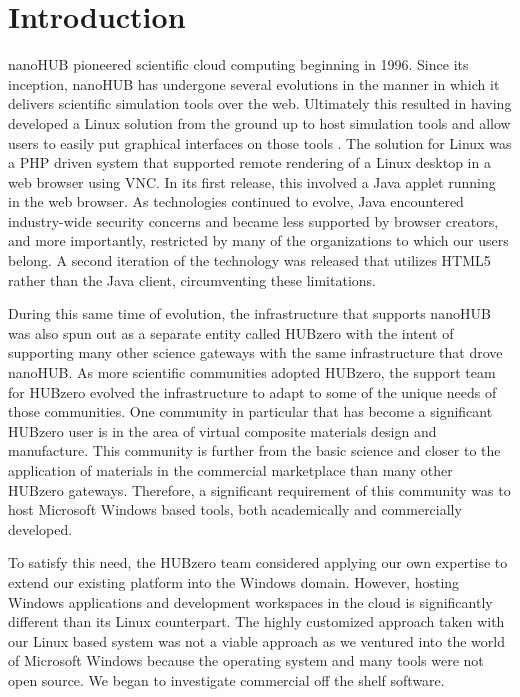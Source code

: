 \documentclass[conference]{../sty/IEEEtran}
\begin{document}
{\begin{abstract}
\end{abstract}



\IEEEpeerreviewmaketitle


\section{Introduction}

nanoHUB \cite{TECHCON:Kapadia96} pioneered scientific cloud computing beginning in 1996.  Since its inception, nanoHUB has undergone several evolutions in the manner in which it delivers scientific simulation tools over the web.  Ultimately this resulted in having developed a Linux solution from the ground up to host simulation tools and allow users to easily put graphical interfaces on those tools \cite{ETechNano:Lundstrom06} \cite{Rappture:McLennan04}.  The solution for Linux was a PHP driven system that supported remote rendering of a Linux desktop in a web browser using VNC.  In its first release, this involved a Java applet running in the web browser.  As technologies continued to evolve, Java encountered industry-wide security concerns and became less supported by browser creators, and more importantly, restricted by many of the organizations to which our users belong.  A second iteration of the technology was released that utilizes HTML5 rather than the Java client, circumventing these limitations.

During this same time of evolution, the infrastructure that supports nanoHUB was also spun out as a separate entity called HUBzero with the intent of supporting many other science gateways with the same infrastructure that drove nanoHUB.  As more scientific communities adopted HUBzero, the support team for HUBzero evolved the infrastructure to adapt to some of the unique needs of those communities.  One community in particular that has become a significant HUBzero user is in the area of virtual composite materials design and manufacture. This community is further from the basic science and closer to the application of materials in the commercial marketplace than many other HUBzero gateways.  Therefore, a significant requirement of this community was to host Microsoft Windows based tools, both academically and commercially developed.

To satisfy this need, the HUBzero team considered applying our own expertise to extend our existing platform into the Windows domain. However, hosting Windows applications and development workspaces in the cloud is significantly different than its Linux counterpart. The highly customized approach taken with our Linux based system was not a viable approach as we ventured into the world of Microsoft Windows because the operating system and many tools were not open source. We began to investigate commercial off the shelf software.

}
\end{document}
